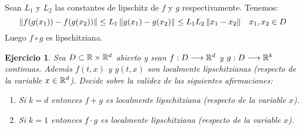 \documentclass[12pt]{article}
\newtheorem{ejercicio}{Ejercicio}
\theoremstyle{definition}
\theoremstyle{remark}
\begin{document}
Sean $L_1$ y $L_2$ las constantes de lipschitz de $f$ y $g$ respectivamente. Tenemos:
\[
\left\lVert f(g(x_1))-f(g(x_2))\right\rVert\leq L_1\left\lVert g(x_1)-g(x_2)\right\rVert\leq L_1L_2\left\lVert x_1-x_2\right\rVert \;\;\; x_1,x_2\in D
\]
Luego $f\circ g$ es lipschitziana.
\begin{ejercicio}
Sea $D\subset\mathbb{R}\times\mathbb{R}^d$ abierto y sean $f : D \longrightarrow \mathbb{R}^d$ y $g : D \longrightarrow \mathbb{R}^k$ continuas. Además $f(t,x)$ y $g(t,x)$ son localmente lipschitzianas (respecto de la variable $x\in\mathbb{R}^d$). Decide sobre la validez de las siguientes afirmaciones:
\begin{enumerate}
\item Si $k=d$ entonces $f+g$ es localmente lipschitziana (respecto de la variable $x$).
\item Si $k=1$ entonces $f\cdot g$ es localmente lipschitziana (respecto de la variable $x$).
\end{enumerate}
\end{ejercicio}
\end{document}
